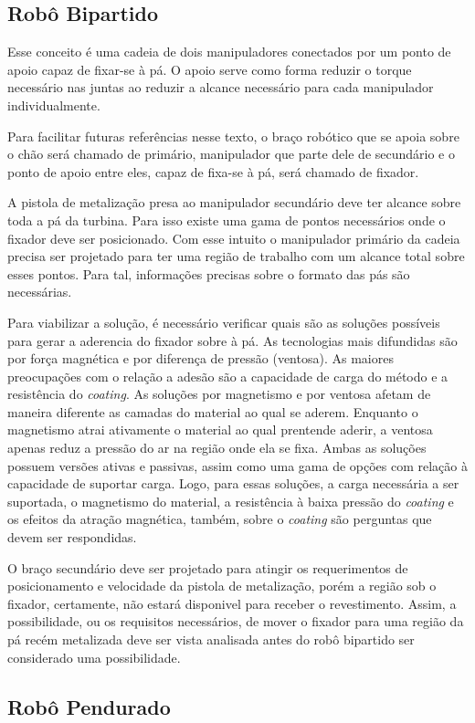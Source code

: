 \subsection{Robô Bipartido}

Esse conceito é uma cadeia de dois manipuladores conectados por um ponto de
apoio capaz de fixar-se à pá. O apoio serve como forma reduzir o torque
necessário nas juntas ao reduzir a alcance necessário para cada manipulador
individualmente.

Para facilitar futuras referências nesse texto, o braço robótico que se
apoia sobre o chão será chamado de primário, manipulador que parte dele de
secundário e o ponto de apoio entre eles, capaz de fixa-se à pá, será chamado de
fixador.

A pistola de metalização presa ao manipulador secundário deve ter
alcance sobre toda a pá da turbina. Para isso existe uma gama de pontos
necessários onde o fixador deve ser posicionado. Com esse intuito o
manipulador primário da cadeia precisa ser projetado para ter uma região de
trabalho com um alcance total sobre esses pontos. Para tal, informações precisas
sobre o formato das pás são necessárias.

Para viabilizar a solução, é necessário verificar quais são as soluções
possíveis para gerar a aderencia do fixador sobre à pá. As tecnologias mais
difundidas são por força magnética e por diferença de pressão (ventosa).
As maiores preocupações com o relação a adesão são a capacidade de carga do
método e a resistência do \textit{coating}. As soluções por magnetismo e
por ventosa afetam de maneira diferente as camadas do material ao qual se
aderem. Enquanto o magnetismo atrai ativamente o material ao qual prentende
aderir, a ventosa apenas reduz a pressão do ar na região onde ela se fixa. Ambas
as soluções possuem versões ativas e passivas, assim como uma gama de opções com
relação à capacidade de suportar carga. Logo, para essas soluções, a carga
necessária a ser suportada, o magnetismo do material, a resistência à baixa
pressão do \textit{coating} e os efeitos da atração magnética, também, sobre o
\textit{coating} são perguntas que devem ser respondidas.

O braço secundário deve ser projetado para atingir os requerimentos de
posicionamento e velocidade da pistola de metalização, porém a região sob o
fixador, certamente, não estará disponivel para receber o revestimento. Assim, a
possibilidade, ou os requisitos necessários, de mover o fixador para uma região
da pá recém metalizada deve ser vista analisada antes do robô bipartido ser
considerado uma possibilidade.

\subsection{Robô Pendurado} 
